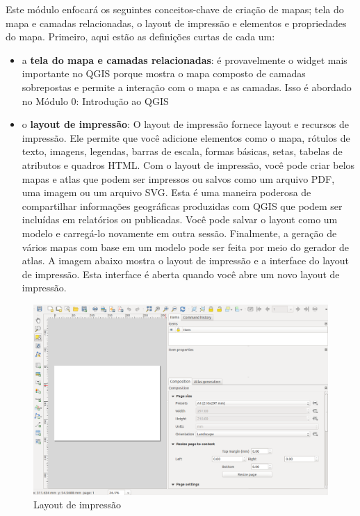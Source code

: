 \documentclass[
]{book}
\providecommand{\tightlist}{%
  \setlength{\itemsep}{0pt}\setlength{\parskip}{0pt}}
\begin{document}
Este módulo enfocará os seguintes conceitos-chave de criação de mapas; tela do mapa e camadas relacionadas, o layout de impressão e elementos e propriedades do mapa. Primeiro, aqui estão as definições curtas de cada um:

\begin{itemize}
\tightlist
\item
  a \textbf{tela do mapa e camadas relacionadas}: é provavelmente o widget mais importante no QGIS porque mostra o mapa composto de camadas sobrepostas e permite a interação com o mapa e as camadas. Isso é abordado no Módulo 0: Introdução ao QGIS
\item
  o \textbf{layout de impressão}: O layout de impressão fornece layout e recursos de impressão. Ele permite que você adicione elementos como o mapa, rótulos de texto, imagens, legendas, barras de escala, formas básicas, setas, tabelas de atributos e quadros HTML. Com o layout de impressão, você pode criar belos mapas e atlas que podem ser impressos ou salvos como um arquivo PDF, uma imagem ou um arquivo SVG. Esta é uma maneira poderosa de compartilhar informações geográficas produzidas com QGIS que podem ser incluídas em relatórios ou publicadas. Você pode salvar o layout como um modelo e carregá-lo novamente em outra sessão. Finalmente, a geração de vários mapas com base em um modelo pode ser feita por meio do gerador de atlas. A imagem abaixo mostra o layout de impressão e a interface do layout de impressão. Esta interface é aberta quando você abre um novo layout de impressão.
\end{itemize}

\begin{figure}
\centering
\includegraphics{media/modulo5/print_comp2.png}
\caption{Layout de impressão}
\end{figure}
\end{document}
